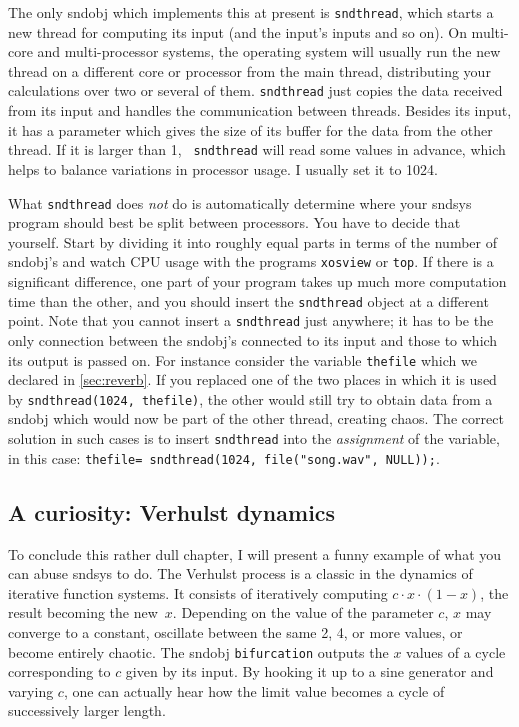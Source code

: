 \documentclass{article}
\def\s{{\sc sndsys} }
\begin{document}
The only sndobj which implements this at present is {\tt sndthread}, which 
starts a new thread for computing its input (and the input's inputs and so on).
On multi-core and multi-processor systems, the operating system will usually
run the new thread on a different core or processor from the main thread,
distributing your calculations over two or several of them.  {\tt sndthread}
just copies the data received from its input and handles the communication
between threads.  Besides its input, it has a parameter which gives the size of
its buffer for the data from the other thread.  If it is larger than 1, {\tt
sndthread} will read some values in advance, which helps to balance variations
in processor usage.  I usually set it to 1024.

What {\tt sndthread} does {\it not} do is automatically determine where your
\s program should best be split between processors.  You have to decide that
yourself.  Start by dividing it into roughly equal parts in terms of the number
of sndobj's and watch CPU usage with the programs {\tt xosview} or {\tt top}.
If there is a significant difference, one part of your program takes up much
more computation time than the other, and you should insert the {\tt sndthread}
object at a different point.  Note that you cannot insert a {\tt sndthread}
just anywhere; it has to be the only connection between the sndobj's connected
to its input and those to which its output is passed on.  For instance consider
the variable {\tt thefile} which we declared in \autoref{sec:reverb}.  If you
replaced one of the two places in which it is used by {\tt sndthread(1024,
thefile)}, the other would still try to obtain data from a sndobj which would
now be part of the other thread, creating chaos.  The correct solution in such
cases is to insert {\tt sndthread} into the {\it assignment} of the variable,
in this case: {\tt thefile= sndthread(1024, file("song.wav", NULL));}.


\subsection{A curiosity: Verhulst dynamics}

To conclude this rather dull chapter, I will present a funny example of what
you can abuse \s to do.  The Verhulst process is a classic in the dynamics of
iterative function systems.  It consists of iteratively computing $c\cdot
x\cdot (1-x)$, the result becoming the new~$x$.  Depending on the value of the
parameter $c$, $x$ may converge to a constant, oscillate between the same 2, 4,
or more values, or become entirely chaotic.  The sndobj {\tt bifurcation}
outputs the $x$ values of a cycle corresponding to $c$ given by its input.
By hooking it up to a sine generator and varying $c$, one can actually hear how the limit value becomes a cycle of successively larger length.
\end{document}

